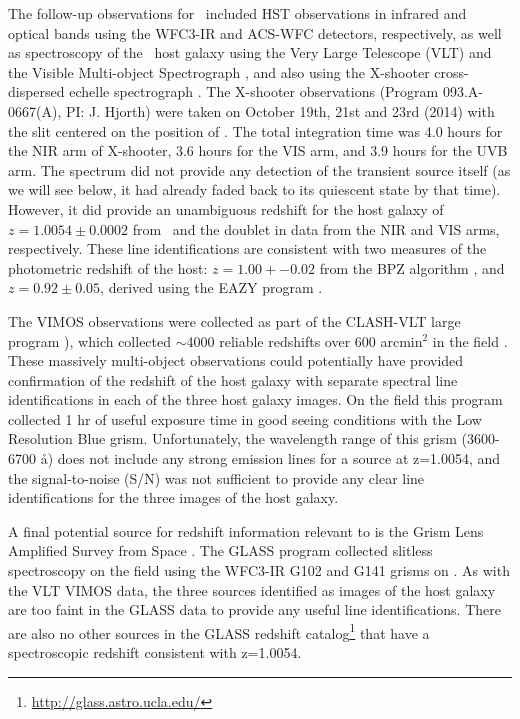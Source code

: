 The follow-up observations for \spock\ included HST observations in
infrared and optical bands using the WFC3-IR and ACS-WFC detectors,
respectively, as well as spectroscopy of the \spock\ host galaxy using
the Very Large Telescope (VLT) and the Visible Multi-object
Spectrograph \citep[VIMOS][]{LeFevre:2003}, and also using the
X-shooter cross-dispersed echelle spectrograph
\citep{Vernet:2011}.  The X-shooter observations
(Program 093.A-0667(A), PI: J. Hjorth) were taken on October 19th,
21st and 23rd (2014) with the slit centered on the position of .  
The total integration time was 4.0 hours for the NIR arm of X-shooter, 
3.6 hours for the VIS arm, and 3.9 hours for the UVB arm.
The spectrum did not provide any
detection of the transient source itself (as we will see below, it had
already faded back to its quiescent state by that time).  However, it
did provide an unambiguous redshift for the host galaxy of
$z=1.0054\pm0.0002$ from \Ha\ and the  doublet in 
data from the NIR and VIS arms, respectively.  These line
identifications are consistent with two measures of the photometric
redshift of the host: $z=1.00+-0.02$ from the BPZ algorithm
\citep{Benitez:2000}, and $z=0.92\pm0.05$, derived using the EAZY
program \citep{Brammer:2008}.

The VIMOS observations were collected as part of the CLASH-VLT large program \citep[Program 186.A-0.798; P.I.: P. Rosati;][]{Rosati:2014}), which collected $\sim$4000 reliable redshifts over 600 arcmin$^2$ in the  field \citep{Grillo:2015a,Balestra:2015}.  These massively multi-object observations could potentially have provided confirmation of the redshift of the \spock host galaxy with separate spectral line identifications in each of the three host galaxy images.  On the  field this program collected 1 hr of useful exposure time in good seeing conditions with the Low Resolution Blue grism.  Unfortunately, the wavelength range of this grism (3600-6700 \aa) does not include any strong emission lines for a source at z=1.0054, and the signal-to-noise (S/N) was not sufficient to provide any clear line identifications for the three images of the \spock host galaxy. 

A final potential source for redshift information relevant to \spock is the Grism Lens Amplified Survey from Space \citep[GLASS; PID: HST-GO-13459; PI:T. Treu][]{Schmidt:2014,Treu:2015a}. The GLASS program collected slitless spectroscopy on the  field using the WFC3-IR G102 and G141 grisms on \HST.  As with the VLT VIMOS data, the three sources identified as images of the \spock host galaxy are too faint in the GLASS data to provide any useful line identifications.  There are also no other sources in the GLASS redshift catalog\footnote{\url{http://glass.astro.ucla.edu/}} that have a spectroscopic redshift consistent with z=1.0054.   


